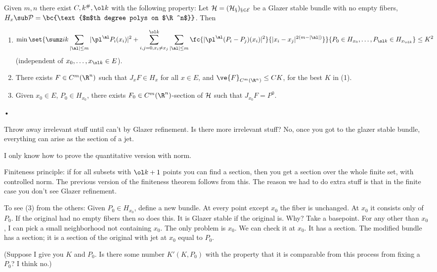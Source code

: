 \begin{lem}
Given $m,n$ there exist $C,k^\#, \ol k$ with the following property: Let $\cal H=(H_x)_{x\in E}$ be a Glazer stable bundle with no empty fibers, $H_x\sub \cal P=\bc{\text{$m$th degree polys on $\R^n$}}$. Then 
\begin{enumerate}
\item
\begin{align}
\min \set{
\sumz ik \sum_{|\al|\le m}
|\pl^\al P_i(x_i)|^2 + 
\sum_{i,j=0,x_i\ne x_j}^{\ol k}  \sum_{|\al|\le m}
\fc{|\pl^\al(P_i-P_j)(x_i)|^2}{|x_i-x_j|^{2(m-|\al|)}}
}{
P_0\in H_{x_0},\ldots, P_{\ol k}\in H_{x_{\ol k}}
}
&\le K^2
\end{align}
(independent of $x_0,\ldots, x_{\ol k}\in E$).
\item
%
There exists $F\in C^m(\R^n)$ such that $J_xF\in H_x$ for all $x\in E$, and $\ve{F}_{C^m(\R^n)} \le CK$, for the best $K$ in (1).
\item
Given $x_0\in E$, $P_0\in H_{x_0}$, there exists $F_0\in C^m(\R^n)$-section of $\cal H$ such that $J_{x_0}F=P^0$. 
\end{enumerate}•
\end{lem}

Throw away irrelevant stuff until can't by Glazer refinement. Is there more irrelevant stuff? No, once you got to the glazer stable bundle, everything can arise as the section of a jet.

I only know how to prove the quantitative version with norm.

Finiteness principle: if for all subsets with $\ol k+1$ points you can find a section, then you get a section over the whole finite set, with controlled norm. The previous version of the finiteness theorem follows from this. The reason we had to do extra stuff is that in the finite case you don't see Glazer refinement. 

To see (3) from the others: Given $P_{0}\in H_{x_0}$, define a new bundle. At every point except $x_0$ the fiber is unchanged. At $x_0$ it consists only of $P_0$. If the original had no empty fibers then so does this. It is Glazer stable if the original is. Why? Take a basepoint. For any other than $x_0$, I can pick a small neighborhood not containing $x_0$. The only problem is $x_0$. We can check it at $x_0$. 
It has a section. The modified bundle has a section; it is a section of the original with jet at $x_0$ equal to $P_0$.

(Suppose I give you $K$ and $P_0$. Is there some number $K'(K,P_0)$ with the property that it is comparable from this process from fixing a $P_0$? I think no.)

